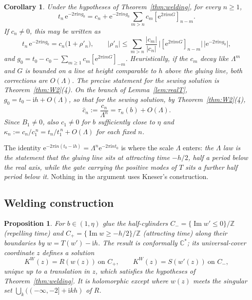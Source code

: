 \documentclass[11pt,a4paper]{article}
\newtheorem{proposition}[theorem]{Proposition}
\newtheorem{corollary}[theorem]{Corollary}
\theoremstyle{definition}
\newcommand{\Rr}{R}
\newcommand{\Kk}{K}
\newcommand{\eee}{\mathrm{e}}
\newcommand{\ii}{\mathrm{i}}
\begin{document}
\begin{corollary}\label{cor:cn}
Under the hypotheses of Theorem~\ref{thm:welding}, for every $n\ge1$,
\[
 t_n\,\eee^{-2\pi\ii ng_0}
 =c_n+\eee^{-2\pi\ii ng_0}
   \sum_{m>n}c_m[\eee^{2\pi\ii mG}]_{n-m}.
\]
If $c_n\ne0$, this may be written as
\[
 t_n\,\eee^{-2\pi\ii ng_0}=c_n\bigl(1+\rho'_n\bigr),\qquad
 |\rho'_n|\le\sum_{m>n}\frac{|c_m|}{|c_n|}\,
 \bigl|[\eee^{2\pi\ii mG}]_{n-m}\bigr|\,\bigl|\eee^{-2\pi\ii ng_0}\bigr|,
\]
and $g_0=t_0-c_0-\sum_{m\ge1}c_m[\eee^{2\pi\ii mG}]_{-m}$.  Heuristically, if the
$c_m$ decay like $\Lambda^m$ and $G$ is bounded on a line at height comparable to
$h$ above the gluing line, both corrections are $O(\Lambda)$.  The precise
statement for the sewing solution is Theorem~\ref{thm:W2}(4).  On the
branch of Lemma~\ref{lem:realT}, $g_0=t_0-\ii h+O(\Lambda)$, so that
for the sewing solution, by Theorem~\ref{thm:W2}(4),
\begin{equation}\label{eq:chat-tau}
 \hat c_n:=\frac{c_n}{\Lambda^n}=\tau_n(b)+O(\Lambda).
\end{equation}
Since $B_1\ne0$, also $c_1\ne0$ for $b$ sufficiently close to $\eta$ and
$\kappa_n:=c_n/c_1^{\,n}=t_n/t_1^{\,n}+O(\Lambda)$ for each fixed $n$.
\end{corollary}

The identity $\eee^{-2\pi\ii n(t_0-\ii h)}=\Lambda^n\eee^{-2\pi\ii nt_0}$
is where the scale $\Lambda$ enters: \emph{the $\Lambda$ law is the statement
that the gluing line sits at attracting time $-h/2$, half a period below the
real axis, while the gate carrying the positive modes of $T$ sits a further
half period below it.}  Nothing in the argument uses Kneser's construction.

\subsection{Welding construction}

\begin{proposition}\label{prop:weld}
For $b\in(1,\eta)$ glue the half-cylinders
$C_-=\{\operatorname{Im}w'\le0\}/\mathbb Z$ (repelling time) and
$C_+=\{\operatorname{Im}w\ge-h/2\}/\mathbb Z$ (attracting time) along their
boundaries by $w=T(w')-\ii h$.  The result is conformally $\mathbb C^*$; its
universal-cover coordinate $z$ defines a solution
\[
 \Kk^{W}(z)=\Rr(w(z))\ \text{on }C_+,\qquad \Kk^{W}(z)=S(w'(z))\ \text{on }C_-,
\]
unique up to a translation in $z$, which satisfies the hypotheses of
Theorem~\ref{thm:welding}.  It is holomorphic except where $w(z)$ meets the
singular set $\bigcup_{k}((-\infty,-2]+\ii kh)$ of $\Rr$.
\end{proposition}
\end{document}
